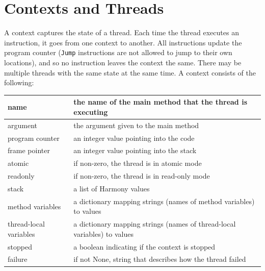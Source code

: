 \documentclass{report}
\begin{document}
\section{Contexts and Threads}
\label{app:context}

A context captures the state of a thread.  Each time the thread
executes an instruction, it goes from one context to another.
All instructions update the program counter (\texttt{Jump} instructions
are not allowed to jump to their own locations), and so no instruction
leaves the context the same.
There may be multiple threads
with the same state at the same time.
A context consists of the following:

\vspace{1em}
\begin{tabular}{|l|l|}
\hline
name & the name of the main method that the thread is executing \\
\hline
argument & the argument given to the main method \\
\hline
program counter & an integer value pointing into the code \\
\hline
frame pointer & an integer value pointing into the stack \\
\hline
atomic & if non-zero, the thread is in atomic mode \\
\hline
readonly & if non-zero, the thread is in read-only mode \\
\hline
stack & a list of Harmony values \\
\hline
method variables & a dictionary mapping strings (names of method variables) to values \\
\hline
thread-local variables & a dictionary mapping strings (names of thread-local variables) to values \\
\hline
stopped & a boolean indicating if the context is stopped \\
\hline
failure & if not None, string that describes how the thread failed \\
\hline
\end{tabular}
\vspace{1em}
\end{document}
